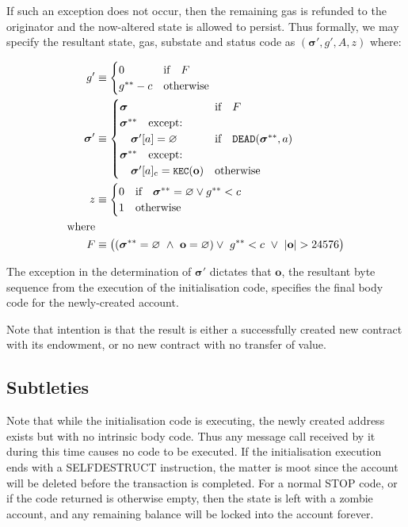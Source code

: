 \documentclass[9pt,oneside]{amsart}
\begin{document}
\begin{multicols}{2}
If such an exception does not occur, then the remaining gas is refunded to the originator and the now-altered state is allowed to persist. Thus formally, we may specify the resultant state, gas, substate and status code as $(\boldsymbol{\sigma}', g', A, z)$ where:

\begin{align}
\quad g' &\equiv \begin{cases}
0 & \text{if} \quad F \\
g^{**} - c & \text{otherwise} \\
\end{cases} \\
\quad \boldsymbol{\sigma}' &\equiv  \begin{cases}
\boldsymbol{\sigma} & \text{if} \quad F \\
\boldsymbol{\sigma}^{**} \quad \text{except:} & \\
\quad\boldsymbol{\sigma}'[a] = \varnothing & \text{if} \quad \mathtt{\tiny DEAD}(\boldsymbol{\sigma}^{**}, a) \\
\boldsymbol{\sigma}^{**} \quad \text{except:} & \\
\quad\boldsymbol{\sigma}'[a]_{\mathrm{c}} = \texttt{\small KEC}(\mathbf{o}) & \text{otherwise}
\end{cases} \\
\quad z &\equiv \begin{cases}
0 & \text{if} \quad \boldsymbol{\sigma}^{**} = \varnothing \lor g^{**} < c \\
1 & \text{otherwise}
\end{cases} \\
\nonumber \text{where} \\
F &\equiv \big((\boldsymbol{\sigma}^{**} = \varnothing \ \wedge\ \mathbf{o} = \varnothing) \vee\  g^{**} < c \ \vee\  |\mathbf{o}| > 24576\big)
\end{align}

The exception in the determination of $\boldsymbol{\sigma}'$ dictates that $\mathbf{o}$, the resultant byte sequence from the execution of the initialisation code, specifies the final body code for the newly-created account.

Note that intention is that the result is either a successfully created new contract with its endowment, or no new contract with no transfer of value.

\subsection{Subtleties}
Note that while the initialisation code is executing, the newly created address exists but with no intrinsic body code. Thus any message call received by it during this time causes no code to be executed. If the initialisation execution ends with a {\small SELFDESTRUCT} instruction, the matter is moot since the account will be deleted before the transaction is completed. For a normal {\small STOP} code, or if the code returned is otherwise empty, then the state is left with a zombie account, and any remaining balance will be locked into the account forever.


\end{multicols}
\end{document}
